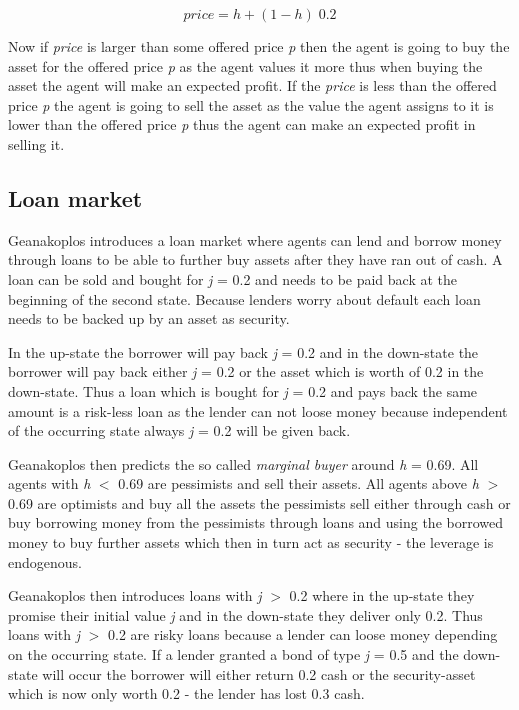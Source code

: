 \documentclass[../Bachelorarbeit.tex]{subfiles}
\begin{document}
\begin{equation}
price = h + (1 - h) \; 0.2
\end{equation}

Now if \textit{price} is larger than some offered price \textit{p} then the agent is going to buy the asset for the offered price \textit{p} as the agent values it more thus when buying the asset the agent will make an expected profit. If the \textit{price} is less than the offered price \textit{p} the agent is going to sell the asset as the value the agent assigns to it is lower than the offered price \textit{p} thus the agent can make an expected profit in selling it.

\subsection{Loan market}
Geanakoplos introduces a loan market where agents can lend and borrow money through loans to be able to further buy assets after they have ran out of cash. A loan can be sold and bought for \textit{j} = 0.2 and needs to be paid back at the beginning of the second state. Because lenders worry about default each loan needs to be backed up by an asset as security.

\medskip

In the up-state the borrower will pay back \textit{j} = 0.2 and in the down-state the borrower will pay back either \textit{j} = 0.2 or the asset which is worth of 0.2 in the down-state. Thus a loan which is bought for \textit{j} = 0.2 and pays back the same amount is a risk-less loan as the lender can not loose money because independent of the occurring state always \textit{j} = 0.2 will be given back.

\medskip

Geanakoplos then predicts the so called \textit{marginal buyer} around \textit{h} = 0.69. All agents with \textit{h} $<$ 0.69 are pessimists and sell their assets. All agents above \textit{h} $>$ 0.69 are optimists and buy all the assets the pessimists sell either through cash or buy borrowing money from the pessimists through loans and using the borrowed money to buy further assets which then in turn act as security - the leverage is endogenous.

\medskip

Geanakoplos then introduces loans with \textit{j} $>$ 0.2 where in the up-state they promise their initial value \textit{j} and in the down-state they deliver only 0.2. Thus loans with \textit{j} $>$ 0.2 are risky loans because a lender can loose money depending on the occurring state. If a lender granted a bond of type \textit{j} = 0.5 and the down-state will occur the borrower will either return 0.2 cash or the security-asset which is now only worth 0.2 - the lender has lost 0.3 cash.
\end{document}
